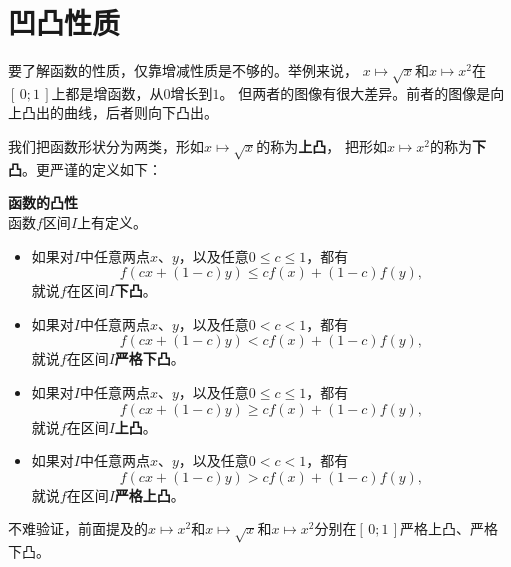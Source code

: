 \documentclass[12pt,UTF8]{ctexbook}
\begin{document}
\section{凹凸性质}

要了解函数的性质，仅靠增减性质是不够的。举例来说，
$x\mapsto \sqrt{x}$和$x\mapsto x^2$在$[\,0;1\,]$上都是增函数，从$0$增长到$1$。
但两者的图像有很大差异。前者的图像是向上凸出的曲线，后者则向下凸出。

我们把函数形状分为两类，形如$x\mapsto \sqrt{x}$的称为\textbf{上凸}，
把形如$x\mapsto x^2$的称为\textbf{下凸}。更严谨的定义如下：

\begin{df}{\textbf{函数的凸性}}
    \mbox{} \\
    函数$f$区间$I$上有定义。
    \begin{itemize}
        \item 如果对$I$中任意两点$x$、$y$，以及任意$0 \leqslant c \leqslant 1$，都有
        $$ f(cx + (1 - c)y) \leqslant cf(x) + (1 - c)f(y), $$
        就说$f$在区间$I$\textbf{下凸}。
        \item 如果对$I$中任意两点$x$、$y$，以及任意$0 < c < 1$，都有
        $$ f(cx + (1 - c)y) < cf(x) + (1 - c)f(y), $$
        就说$f$在区间$I$\textbf{严格下凸}。
        \item 如果对$I$中任意两点$x$、$y$，以及任意$0 \leqslant c \leqslant 1$，都有
        $$ f(cx + (1 - c)y) \geqslant cf(x) + (1 - c)f(y), $$
        就说$f$在区间$I$\textbf{上凸}。
        \item 如果对$I$中任意两点$x$、$y$，以及任意$0 < c < 1$，都有
        $$ f(cx + (1 - c)y) > cf(x) + (1 - c)f(y), $$
        就说$f$在区间$I$\textbf{严格上凸}。
    \end{itemize}
\end{df}

不难验证，前面提及的$x\mapsto x^2$和$x\mapsto \sqrt{x}$和$x\mapsto x^2$分别在$[\,0;1\,]$严格上凸、严格下凸。
\end{document}
